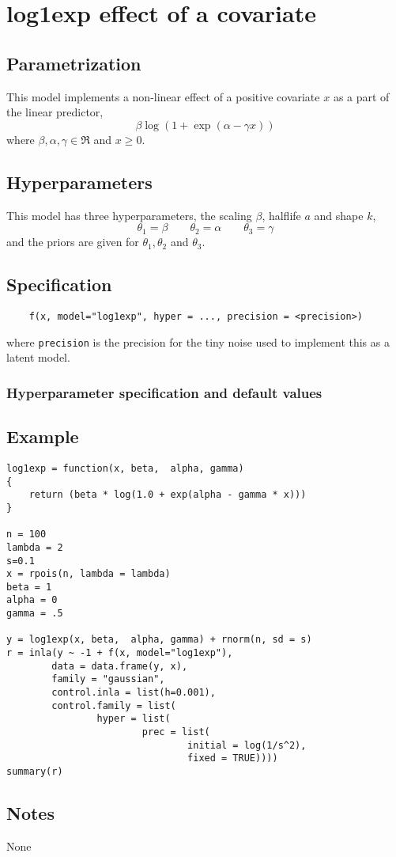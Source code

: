 \documentclass[a4paper,11pt]{article}
\begin{document}
\section*{log1exp effect of a covariate}

\subsection*{Parametrization}

This model implements a non-linear effect of a positive covariate $x$
as a part of the linear predictor,
\begin{displaymath}
    \beta \log\left(1 + \exp(\alpha -\gamma x)\right)
\end{displaymath}
where $\beta, \alpha, \gamma \in \Re$ and $x\ge 0$.

\subsection*{Hyperparameters}

This model has three hyperparameters, the scaling $\beta$, halflife
$a$ and shape $k$,
\begin{displaymath}
    \theta_1 = \beta \qquad \theta_2 = \alpha \qquad  \theta_3 = \gamma
\end{displaymath}
and the priors are given for $\theta_1, \theta_2$ and $\theta_3$.


\subsection*{Specification}

\begin{verbatim}
    f(x, model="log1exp", hyper = ..., precision = <precision>)
\end{verbatim}
where \texttt{precision} is the precision for the tiny noise used to
implement this as a latent model. 

\subsubsection*{Hyperparameter specification and default values}


\subsection*{Example}

\begin{verbatim}
log1exp = function(x, beta,  alpha, gamma)
{
    return (beta * log(1.0 + exp(alpha - gamma * x)))
}

n = 100
lambda = 2
s=0.1
x = rpois(n, lambda = lambda)
beta = 1
alpha = 0
gamma = .5

y = log1exp(x, beta,  alpha, gamma) + rnorm(n, sd = s)
r = inla(y ~ -1 + f(x, model="log1exp"),
        data = data.frame(y, x),
        family = "gaussian",
        control.inla = list(h=0.001), 
        control.family = list(
                hyper = list(
                        prec = list(
                                initial = log(1/s^2),
                                fixed = TRUE))))
summary(r)
\end{verbatim}

\subsection*{Notes}
None
\end{document}
